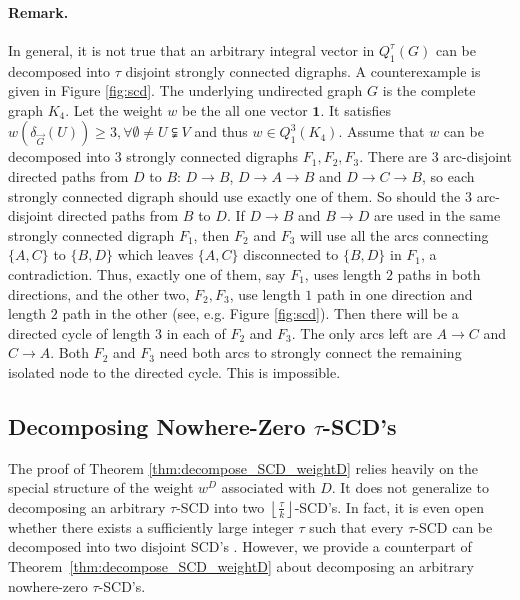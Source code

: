 \documentclass[runningheads]{llncs}
\newcommand{\rounddown}[1]{\left\lfloor#1\right\rfloor}
\begin{document}
\paragraph{Remark.} In general, it is not true that an arbitrary integral vector in $Q_1^\tau(G)$ can be decomposed into $\tau$ disjoint strongly connected digraphs. A counterexample is given in Figure \ref{fig:scd}. The underlying undirected graph $G$ is the complete graph $K_4$. Let the weight $w$ be the all one vector $\mathbf{1}$. It satisfies $w(\delta_{\vec{G}}(U))\geq 3, \forall \emptyset \neq U\subsetneqq V$ and thus $w\in Q_1^3(K_4)$. Assume that $w$ can be decomposed into $3$ strongly connected digraphs $F_1,F_2,F_3$. There are $3$ arc-disjoint directed paths from $D$ to $B$: $D\rightarrow B$, $D\rightarrow A\rightarrow B$ and $D\rightarrow C\rightarrow B$, so each strongly connected digraph should use exactly one of them. So should the $3$ arc-disjoint directed paths from $B$ to $D$. If $D\rightarrow B$ and $B\rightarrow D$ are used in the same strongly connected digraph $F_1$, then $F_2$ and $F_3$ will use all the arcs connecting $\{A,C\}$ to $\{B,D\}$ which leaves $\{A,C\}$ disconnected to $\{B,D\}$ in $F_1$, a contradiction. Thus, exactly one of them, say $F_1$, uses length $2$ paths in both directions, and the other two, $F_2,F_3$, use length $1$ path in one direction and length $2$ path in the other (see, e.g. Figure \ref{fig:scd}). Then there will be a directed cycle of length $3$ in each of $F_2$ and $F_3$. The only arcs left are $A\rightarrow C$ and $C\rightarrow A$. Both $F_2$ and $F_3$ need both arcs to strongly connect the remaining isolated node to the directed cycle. This is impossible. 



\subsection{Decomposing Nowhere-Zero $\tau$-SCD's}
The proof of Theorem \ref{thm:decompose_SCD_weightD} relies heavily on the special structure of the weight $w^D$ associated with $D$. It does not generalize to decomposing an arbitrary $\tau$-SCD into two $\rounddown{\frac{\tau}{k}}$-SCD's. In fact, it is even open whether there exists a sufficiently large integer $\tau$ such that every $\tau$-SCD can be decomposed into two disjoint SCD's \cite{bang2004decomposing}.   However, we provide a counterpart of Theorem~\ref{thm:decompose_SCD_weightD} about decomposing an arbitrary nowhere-zero $\tau$-SCD's.
\end{document}
